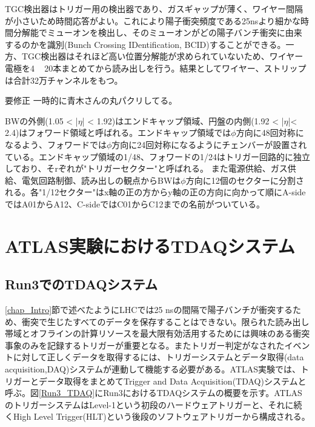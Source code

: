 TGC検出器はトリガー用の検出器であり、ガスギャップが薄く、ワイヤー間隔が小さいため時間応答がよい。これにより陽子衝突頻度である25nsより細かな時間分解能でミューオンを検出し、そのミューオンがどの陽子バンチ衝突に由来するのかを識別(Bunch Crossing IDentification, BCID)することができる。一方、TGC検出器はそれほど高い位置分解能が求められていないため、ワイヤー電極を4 ~ 20本まとめてから読み出しを行う。結果としてワイヤー、ストリップは合計32万チャンネルをもつ。

\begin{itembox}{要修正}
    一時的に青木さんの丸パクリしてる。
\end{itembox}

BWの外側(1.05 < |$\eta$| < 1.92)はエンドキャップ領域、円盤の内側(1.92 < |$\eta$|< 2.4)はフォワード領域と呼ばれる。エンドキャップ領域では$\phi$方向に48回対称になるよう、フォワードでは$\phi$方向に24回対称になるようにチェンバーが設置されている。エンドキャップ領域の1/48、フォワードの1/24はトリガー回路的に独立しており、そrぞれが"トリガーセクター"と呼ばれる。
また電源供給、ガス供給、電気回路制御、読み出しの観点からBWは$\phi$方向に12個のセクターに分割される。各"1/12セクター"はx軸の正の方からy軸の正の方向に向かって順にA-sideではA01からA12、C-sideではC01からC12までの名前がついている。



\section{ATLAS実験におけるTDAQシステム}
\label{sec_TDAQ}
   
    \subsection{Run3でのTDAQシステム}
    \label{subsec_run3TDAQ}
    \ref{chap_Intro}節で述べたようにLHCでは25 nsの間隔で陽子バンチが衝突するため、衝突で生じたすべてのデータを保存することはできない。限られた読み出し帯域とオフラインの計算リソースを最大限有効活用するためには興味のある衝突事象のみを記録するトリガーが重要となる。またトリガー判定がなされたイベントに対して正しくデータを取得するには、トリガーシステムとデータ取得(data acquisition,DAQ)システムが連動して機能する必要がある。ATLAS実験では、トリガーとデータ取得をまとめてTrigger and Data Acquisition(TDAQ)システムと呼ぶ。図\ref{Run3_TDAQ}にRun3におけるTDAQシステムの概要を示す。ATLASのトリガーシステムはLevel-1という初段のハードウェアトリガーと、それに続くHigh Level Trigger(HLT)という後段のソフトウェアトリガーから構成される。

